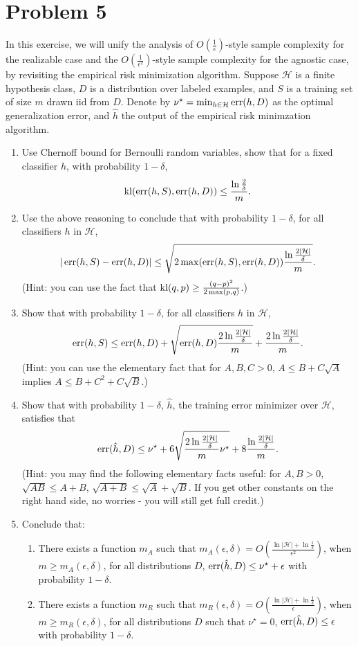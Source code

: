 \documentclass{article}
\DeclareMathOperator*{\kl}{{\rm kl}}
\DeclareMathOperator*{\err}{{\rm err}}
\newcommand{\Hcal}{\mathcal{H}} %
\begin{document}
\section*{Problem 5}
In this exercise, we will unify the analysis of $O(\frac{1}{\epsilon})$-style sample
complexity for the realizable case and the $O(\frac{1}{\epsilon^2})$-style sample complexity
for the agnostic case, by revisiting the empirical risk minimization algorithm. Suppose $\Hcal$ is a finite hypothesis class, $D$ is a distribution over labeled examples, and $S$ is a training set of size $m$ drawn iid from $D$. Denote by  $\nu^\star = \min_{h \in \Hcal} \err(h,D)$ as the optimal generalization error, and $\hat{h}$ the output of the empirical risk minimzation algorithm.

\begin{enumerate}
\item Use Chernoff bound for Bernoulli random variables, show that for a fixed classifier
$h$, with probability $1-\delta$,
\[ \kl(\err(h,S), \err(h,D)) \leq \frac{\ln\frac{2}{\delta}}{m}. \]
\item Use the above reasoning to conclude that with probability $1-\delta$, for all classifiers $h$ in $\Hcal$,
\[ |\err(h,S) - \err(h,D)| \leq \sqrt{2 \max(\err(h,S), \err(h,D)) \frac{\ln\frac{2|\Hcal|}{\delta}}{m}}. \]
(Hint: you can use the fact that $\kl(q,p) \geq \frac{(q-p)^2}{2\max(p,q)}$.)
\item Show that with probability $1-\delta$, for all classifiers $h$ in $\Hcal$,
\[ \err(h,S) \leq \err(h,D) + \sqrt{\err(h,D) \frac{2\ln\frac{2|\Hcal|}{\delta}}{m}} + \frac{2\ln\frac{2|\Hcal|}{\delta}}{m}. \]
(Hint: you can use the elementary fact that for $A, B, C > 0$, $A \leq B + C \sqrt{A}$ implies $A \leq B + C^2 + C\sqrt{B}$.)
\item Show that with probability $1-\delta$, $\hat{h}$, the training error minimizer over $\Hcal$, satisfies that
\[ \err(\hat{h}, D) \leq \nu^\star + 6\sqrt{\frac{2\ln\frac{2|\Hcal|}{\delta}}{m} \nu^\star} + 8\frac{\ln\frac{2|\Hcal|}{\delta}}{m}. \]
(Hint: you may find the following elementary facts useful: for $A, B > 0$, $\sqrt{AB} \leq A +B$, $\sqrt{A + B} \leq \sqrt{A} + \sqrt{B}$. If you get other constants on the right hand side, no worries - you will still get full credit.)
\item Conclude that:
\begin{enumerate}
  \item There exists a function $m_A$ such that $m_A(\epsilon,\delta) = O(\frac{\ln|\Hcal| + \ln\frac1\delta}{\epsilon^2})$, when $m \geq m_A(\epsilon,\delta)$, for all distributions $D$, $\err(\hat{h}, D) \leq \nu^\star + \epsilon$ with probability $1-\delta$.
  \item There exists a function $m_R$ such that $m_R(\epsilon,\delta) = O(\frac{\ln|\Hcal| + \ln\frac1\delta}{\epsilon})$, when $m \geq m_R(\epsilon,\delta)$, for all distributions $D$ such that $\nu^\star = 0$, $\err(\hat{h}, D) \leq \epsilon$ with probability $1-\delta$.
\end{enumerate}
\end{enumerate}
\end{document}
